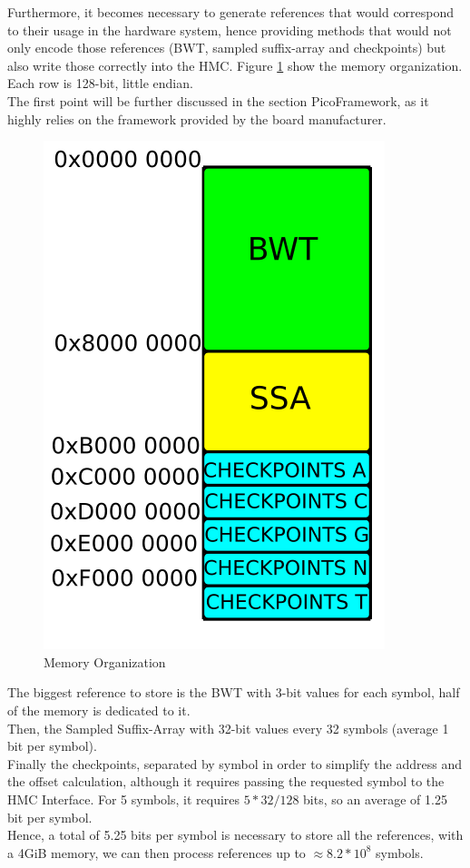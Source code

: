 Furthermore, it becomes necessary to generate references that would correspond to their usage in the hardware system, hence providing methods that would not only encode those references (BWT, sampled suffix-array and checkpoints) but also write those correctly into the HMC. Figure \ref{fig:memory} show the memory organization. Each row is 128-bit, little endian. \\

The first point will be further discussed in the section PicoFramework, as it highly relies on the framework provided by the board manufacturer.

\begin{minipage}[t]{0.4\textwidth}
\begin{figure}[H]
    \centering
    \hspace*{-10mm}\includegraphics[scale = 0.4]{Figures/MEM_RPZ.png}
    \caption{Memory Organization}
    \label{fig:memory}
\end{figure}
\end{minipage}
\hfill
\begin{minipage}[t]{0.5\textwidth}

The biggest reference to store is the BWT with 3-bit values for each symbol, half of the memory is dedicated to it. \\
Then, the Sampled Suffix-Array with 32-bit values every 32 symbols (average 1 bit per symbol). \\
Finally the checkpoints, separated by symbol in order to simplify the address and the offset calculation, although it requires passing the requested symbol to the HMC Interface. For 5 symbols, it requires $5 * 32 / 128$ bits, so an average of 1.25 bit per symbol.\\
Hence, a total of 5.25 bits per symbol is necessary to store all the references, with a 4GiB memory, we can then process references up to $\approx 8.2*10^{8}$ symbols.
\end{minipage}

